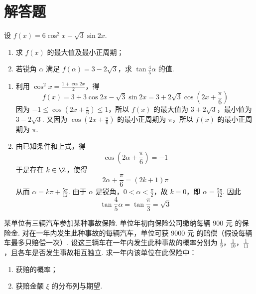 \section{解答题}

\begin{problem}
设 \( f(x) = 6\cos^2 x - \sqrt{3}\sin 2x \).

\begin{enumerate}
\item 求 \( f(x) \) 的最大值及最小正周期；
\item 若锐角 \(\alpha\) 满足 \(f(\alpha) = 3 - 2\sqrt{3}\)，求 \(\tan \frac{4}{5} \alpha\) 的值.
\end{enumerate}
\end{problem}

\begin{solution}
\begin{enumerate}
\item 利用 \(\cos^{2}x=\frac{1+\cos 2x}{2}\)，得
\[
f(x)=3+3\cos 2x-\sqrt{3}\sin 2x
    =3+2\sqrt{3}\cos\left(2x+\frac{\pi}{6}\right)
\]
因为 \(-1\leqslant\cos\left(2x+\frac{\pi}{6}\right)\leqslant1\)，所以 \(f(x)\) 的最大值为 \(3+2\sqrt{3}\)，最小值为 \(3-2\sqrt{3}\). 又因为 \(\cos\left(2x+\frac{\pi}{6}\right)\) 的最小正周期为 \(\pi\)，所以 \(f(x)\) 的最小正周期为 \(\pi\).
\item 由已知条件和上式，得
\[
\cos\left(2\alpha+\frac{\pi}{6}\right)=-1
\]
于是存在 \(k\in\Z\)，使得
\[
2\alpha+\frac{\pi}{6}=(2k+1)\pi
\]
从而 \(\alpha=k\pi+\frac{5\pi}{12}\). 由于 \(\alpha\) 是锐角，\(0<\alpha<\frac{\pi}{2}\)，故 \(k=0\)，即 \(\alpha=\frac{5\pi}{12}\). 因此
\[
\tan\frac{4}{5}\alpha=\tan\frac{\pi}{3}=\sqrt{3}
\]
\end{enumerate}
\end{solution}

\begin{problem}
某单位有三辆汽车参加某种事故保险. 单位年初向保险公司缴纳每辆 \(900\text{ 元}\) 的保险金. 对在一年内发生此种事故的每辆汽车，单位可获 \(9000\text{ 元}\) 的赔偿（假设每辆车最多只赔偿一次）. 设这三辆车在一年内发生此种事故的概率分别为 \(\frac{1}{9}\)，\(\frac{1}{10}\)，\(\frac{1}{11}\)，且各车是否发生事故相互独立. 求一年内该单位在此保险中：

\begin{enumerate}
\item 获赔的概率；
\item 获赔金额 \( \xi \) 的分布列与期望.
\end{enumerate}
\end{problem}

